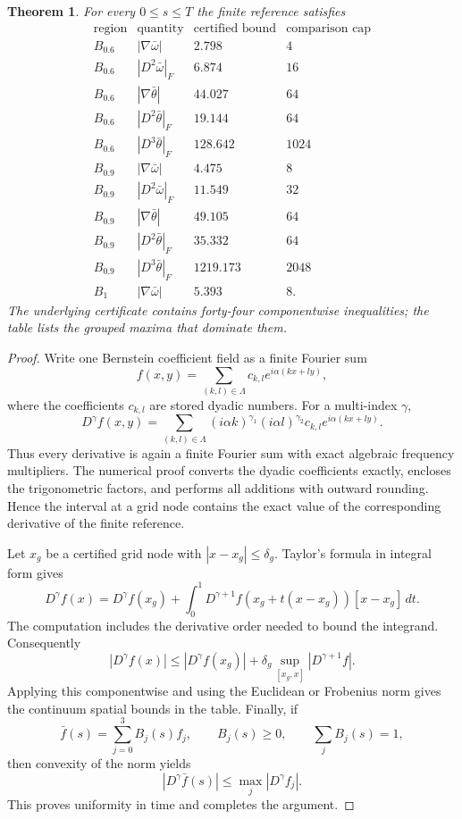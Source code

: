 \documentclass[10pt,a4paper]{amsart}
\newtheorem{theorem}{Theorem}
\begin{document}
\begin{theorem}\label{thm:reference-derivatives}
For every $0\le s\le T$ the finite reference satisfies
\[
\begin{array}{c|c|c|c}
\text{region}&\text{quantity}&\text{certified bound}&\text{comparison cap}\\ \hline
B_{0.6}&|\nabla\bar\omega|&2.798&4\\
B_{0.6}&|D^2\bar\omega|_F&6.874&16\\
B_{0.6}&|\nabla\bar\theta|&44.027&64\\
B_{0.6}&|D^2\bar\theta|_F&19.144&64\\
B_{0.6}&|D^3\bar\theta|_F&128.642&1024\\
B_{0.9}&|\nabla\bar\omega|&4.475&8\\
B_{0.9}&|D^2\bar\omega|_F&11.549&32\\
B_{0.9}&|\nabla\bar\theta|&49.105&64\\
B_{0.9}&|D^2\bar\theta|_F&35.332&64\\
B_{0.9}&|D^3\bar\theta|_F&1219.173&2048\\
B_1&|\nabla\bar\omega|&5.393&8.
\end{array}
\]
The underlying certificate contains forty-four componentwise inequalities; the table lists the grouped maxima that dominate them.
\end{theorem}

\begin{proof}
Write one Bernstein coefficient field as a finite Fourier sum
\[
f(x,y)=\sum_{(k,l)\in\Lambda} c_{k,l}e^{i\alpha(kx+ly)},
\]
where the coefficients $c_{k,l}$ are stored dyadic numbers.  For a multi-index $\gamma$,
\[
D^\gamma f(x,y)=\sum_{(k,l)\in\Lambda}
(i\alpha k)^{\gamma_1}(i\alpha l)^{\gamma_2}c_{k,l}e^{i\alpha(kx+ly)}.
\]
Thus every derivative is again a finite Fourier sum with exact algebraic frequency multipliers.  The numerical proof converts the dyadic coefficients exactly, encloses the trigonometric factors, and performs all additions with outward rounding.  Hence the interval at a grid node contains the exact value of the corresponding derivative of the finite reference.

Let $x_g$ be a certified grid node with $|x-x_g|\le\delta_g$.  Taylor's formula in integral form gives
\[
D^\gamma f(x)=D^\gamma f(x_g)
+\int_0^1D^{\gamma+1}f(x_g+t(x-x_g))[x-x_g]\,dt.
\]
The computation includes the derivative order needed to bound the integrand.  Consequently
\[
|D^\gamma f(x)|
\le |D^\gamma f(x_g)|+\delta_g
\sup_{[x_g,x]}|D^{\gamma+1}f|.
\]
Applying this componentwise and using the Euclidean or Frobenius norm gives the continuum spatial bounds in the table.  Finally, if
\[
\bar f(s)=\sum_{j=0}^3B_j(s)f_j,
\qquad B_j(s)\ge0,\qquad\sum_jB_j(s)=1,
\]
then convexity of the norm yields
\[
|D^\gamma\bar f(s)|\le\max_j|D^\gamma f_j|.
\]
This proves uniformity in time and completes the argument.
\end{proof}
\end{document}

